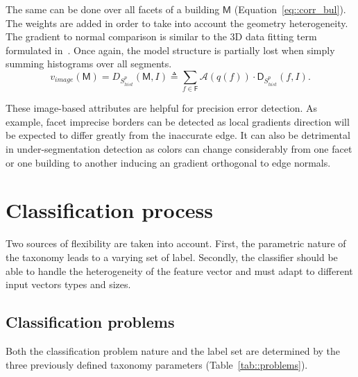         The same can be done over all facets of a building $\mathsf{M}$ (Equation~\ref{eq::corr_bul}). The weights are added in order to take into account the geometry heterogeneity. The gradient to normal comparison is similar to the 3D data fitting term formulated in~\parencite{li2016boxfitting}. Once again, the model structure is partially lost when simply summing histograms over all segments.
        \begin{equation}
            \label{eq::corr_bul}
            v_{image}(\mathsf{M}) = D_{S_{hist}^p}(\mathsf{M}, I) \triangleq \sum_{f \in \mathsf{F}} \mathscr{A}(q(f)) \cdot \mathsf{D}_{S_{hist}^p}(f, I).
        \end{equation}
        
        These image-based attributes are helpful for precision error detection. As example, facet imprecise borders can be detected as local gradients direction will be expected to differ greatly from the inaccurate edge. It can also be detrimental in under-segmentation detection as colors can change considerably from one facet or one building to another inducing an gradient orthogonal to edge normals.

    \section{Classification process}
        Two sources of flexibility are taken into account.
        First, the parametric nature of the taxonomy leads to a varying set of label.
        Secondly, the classifier should be able to handle the heterogeneity of the feature vector and must adapt to different input vectors types and sizes.

    \subsection{Classification problems}
        Both the classification problem nature and the label set are determined by the three previously defined taxonomy parameters (Table~\ref{tab::problems}).

